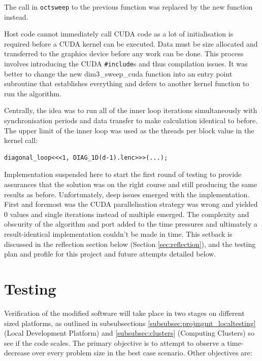 \documentclass[conference]{IEEEtran}
\begin{document}
The call in \texttt{octsweep} to the previous function was replaced by the new function instead.

Host code cannot immediately call CUDA code as a lot of initialisation is required before a CUDA kernel can be executed. Data must be size allocated and transferred to the graphics device before any work can be done. This process involves introducing the CUDA \texttt{\#include}s and thus compilation issues. It was better to change the new dim3\_sweep\_cuda function into an entry point subroutine that establishes everything and defers to another kernel function to run the algorithm.

Centrally, the idea was to run all of the inner loop iterations simultaneously with synchronisation periods and data transfer to make calculation identical to before. The upper limit of the inner loop was used as the threads per block value in the kernel call:

\begin{lstlisting}[breaklines]
diagonal_loop<<<1, DIAG_1D(d-1).lenc>>>(...);
\end{lstlisting}

Implementation suspended here to start the first round of testing to provide assurances that the solution was on the right course and still producing the same results as before. Unfortunately, deep issues emerged with the implementation. First and foremost was the CUDA parallelisation strategy was wrong and yielded 0 values and single iterations instead of multiple emerged. The complexity and obscurity of the algorithm and port added to the time pressures and ultimately a result-identical implementation couldn't be made in time. This setback is discussed in the reflection section below (Section \ref{sec:reflection}), and the testing plan and profile for this project and future attempts detailed below.



\section{Testing}
\label{sec:testing}

Verification of the modified software will take place in two stages on different sized platforms, as outlined in subsubsections \ref{subsubsec:projmgmt_localtesting} (Local Development Platform) and \ref{subsubsec:clusters} (Computing Clusters) so see if the code scales. The primary objective is to attempt to observe a time-decrease over every problem size in the best case scenario. Other objectives are:
\end{document}
